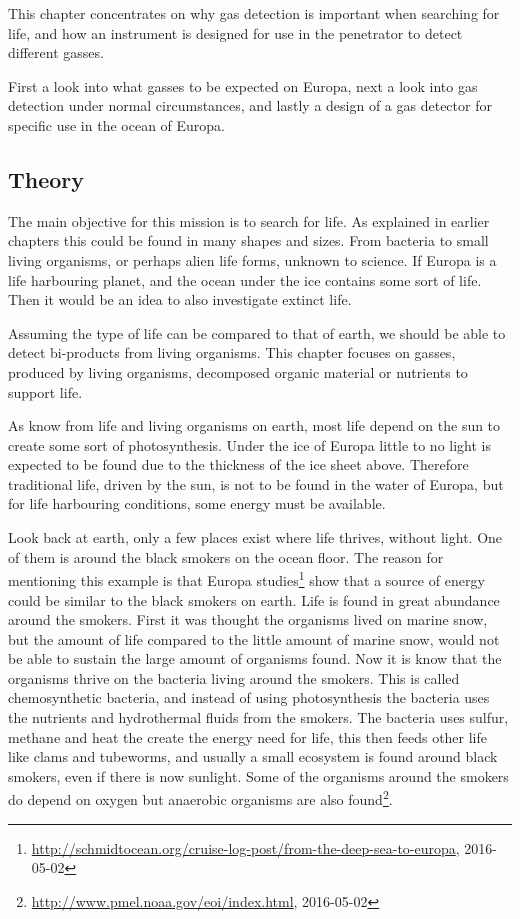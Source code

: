 
This chapter concentrates on why gas detection is important when searching for life, and how an instrument is designed for use in the penetrator to detect different gasses.

First a look into what gasses to be expected on Europa, next a look into gas detection under normal circumstances, and lastly a design of a gas detector for specific use in the ocean of Europa.

\subsection{Theory}

The main objective for this mission is to search for life. As explained in earlier chapters this could be found in many shapes and sizes. From bacteria to small living organisms, or perhaps alien life forms, unknown to science. If Europa is a life harbouring planet, and the ocean under the ice contains some sort of life. Then it would be an idea to also investigate extinct life.

Assuming the type of life can be compared to that of earth, we should be able to detect bi-products from living organisms. This chapter focuses on gasses, produced by living organisms, decomposed organic material or nutrients to support life.

As know from life and living organisms on earth, most life depend on the sun to create some sort of photosynthesis. Under the ice of Europa little to no light is expected to be found due to the thickness of the ice sheet above. Therefore traditional life, driven by the sun, is not to be found in the water of Europa, but for life harbouring conditions, some energy must be available.

Look back at earth, only a few places exist where life thrives, without light. One of them is around the black smokers on the ocean floor. The reason for mentioning this example is that Europa studies\footnote{\url{http://schmidtocean.org/cruise-log-post/from-the-deep-sea-to-europa}, 2016-05-02} show that a source of energy could be similar to the black smokers on earth. Life is found in great abundance around the smokers. First it was thought the organisms lived on marine snow, but the amount of life compared to the little amount of marine snow, would not be able to sustain the large amount of organisms found. Now it is know that the organisms thrive on the bacteria living around the smokers. This is called chemosynthetic bacteria, and instead of using photosynthesis the bacteria uses the nutrients and hydrothermal fluids from the smokers. The bacteria uses sulfur, methane and heat the create the energy need for life, this then feeds other life like clams and tubeworms, and usually a small ecosystem is found around black smokers, even if there is now sunlight. Some of the organisms around the smokers do depend on oxygen but anaerobic organisms are also found\footnote{\url{http://www.pmel.noaa.gov/eoi/index.html}, 2016-05-02}.

